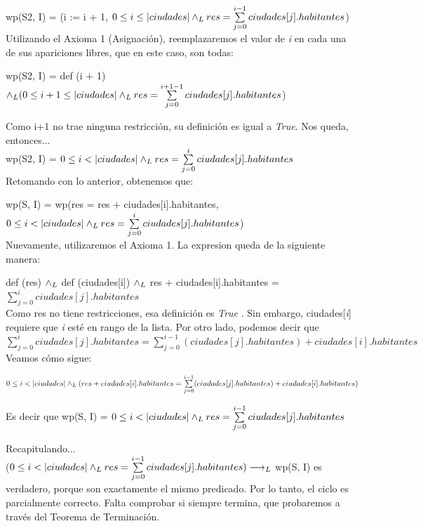 \documentclass[10pt,a4paper]{article}
\begin{document}
\begin{enumerate}
    wp(S2, I) = (i := i + 1, $0 \leq i \leq |ciudades| \land _L res = \sum\limits_{j=0}^{i - 1}ciudades[j].habitantes$) \\

    Utilizando el Axioma 1 (Asignación), reemplazaremos el valor de \textit{i} en cada una de sus apariciones libres, que en este caso, son todas:
    
    wp(S2, I) = def (i + 1) $\land _L (0 \leq i+1 \leq |ciudades| \land _L res = \sum\limits_{j=0}^{i + 1 - 1}ciudades[j].habitantes$)
    
    Como i+1 no trae ninguna restricción, su definición es igual a \textit{True}. Nos queda, entonces...\\
    
    wp(S2, I) = $0 \leq i < |ciudades| \land _L res = \sum\limits_{j=0}^{i}ciudades[j].habitantes$\\
    
    Retomando con lo anterior, obtenemos que:

    wp(S, I) = wp(res = res + ciudades[i].habitantes, $0 \leq i < |ciudades| \land _L res = \sum\limits_{j=0}^{i}ciudades[j].habitantes$)\\

    Nuevamente, utilizaremos el Axioma 1. La expresion queda de la siguiente manera:
    
    def (res) $\land _L$ def (ciudades[i]) $\land _L$ res + ciudades[i].habitantes = $\sum\limits_{j=0}^{i}ciudades[j].habitantes$\\

    Como res no tiene restricciones, esa definición es \textit{True }. Sin embargo, ciudades[\textit{i}] requiere que \textit{i} esté en rango de la lista. Por otro lado, podemos decir que $\sum\limits_{j=0}^{i}ciudades[j].habitantes = \sum\limits_{j=0}^{i-1}(ciudades[j].habitantes) + ciudades[i].habitantes$ Veamos cómo sigue:

    $0 \leq i < |ciudades| \land _L (res + ciudades[i].habitantes = \sum\limits_{j=0}^{i-1}(ciudades[j].habitantes) + ciudades[i].habitantes)$ 
    
    Es decir que wp(S, I) = $0 \leq i < |ciudades| \land _L res = \sum\limits_{j=0}^{i-1}ciudades[j].habitantes$
 
\end{enumerate}

    Recapitulando...\\

    ($0 \leq i < |ciudades| \land _L res = \sum\limits_{j=0}^{i - 1}ciudades[j].habitantes) \longrightarrow _L$ wp(S, I) es verdadero, porque son exactamente el mismo predicado. Por lo tanto, el ciclo es parcialmente correcto. Falta comprobar si siempre termina, que probaremos a través del Teorema de Terminación.\\
    
\end{document}
